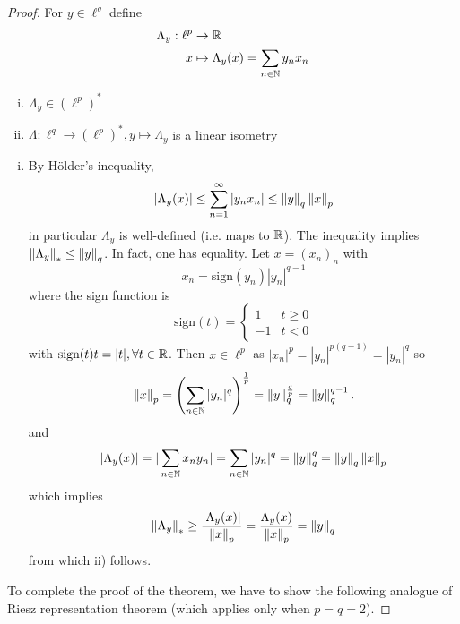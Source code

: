 \documentclass{article}
\begin{document}
\begin{proof}
	For  \(y \in \ell^q\) define
	\begin{align*}
		\Lambda_y: \ell^p & \to \mathbb{R}                                         \\
		x                 & \mapsto \Lambda_y(x) = \sum_{n \in \mathbb{N}} y_n x_n
	\end{align*}

	\begin{lemma}
		\phantom{a lemma here}
		\label{isometry in lp dual}
		\begin{enumerate}[i)]
			\item  \(\Lambda_y \in (\ell^p)^*\)
			\item  \(\Lambda: \ell^q \to (\ell^p)^*, y \mapsto \Lambda_y\) is a linear isometry
		\end{enumerate}
	\end{lemma}
	\begin{enumerate}[i)]
		\item By Hölder's inequality,
		      \begin{equation*}
			      \left|\Lambda_y(x)\right|
			      \leq\sum_{n=1}^{\infty}|y_n x_n|
			      \leq\left\|{y}\right\|_q\left\|{x}\right\|_p
		      \end{equation*}
		      in particular  \(\Lambda_y\) is well-defined (i.e. maps to  \(\mathbb{R}\)). The inequality implies  \(\left\|{\Lambda_y}\right\|_* \leq \left\|{y}\right\|_q\).
		      In fact, one has equality. Let  \(x=(x_n)_n\) with
		      \[x_n = \textrm{sign}(y_n) |y_n|^{q-1}\]
		      where the sign function is
		      \begin{equation*}
			      \textrm{sign}(t) = \begin{cases}
				      1  & t \geq 0 \\
				      -1 & t<0
			      \end{cases}
		      \end{equation*}
		      with  \(\textrm{sign}(t)t=|t|, \forall t \in \mathbb{R}\).
		      Then  \(x \in \ell^p\) as  \(|x_n|^p=|y_n|^{p(q-1)}=|y_n|^q\) so
		      \[
			      \left\|{x}\right\|_p = \left(\sum_{n \in \mathbb{N}} |y_n|^q\right)^{\frac{1}{p}} = \left\|{y}\right\|_q^{\frac{q}{p}} = \left\|{y}\right\|_q^{q-1}.
		      \]
		      and
		      \[
			      |\Lambda_y(x)| = |\sum_{n \in \mathbb{N}} x_ny_n| = \sum_{n \in \mathbb{N}} |y_n|^q = \left\|{y}\right\|^q_q =\left\|{y}\right\|_q\left\|{x}\right\|_p
		      \]
		      which implies
		      \[
			      \left\|{\Lambda_y}\right\|_* \geq \frac{|\Lambda_y(x)|}{\left\|{x}\right\|_p} = \frac{\Lambda_y(x)}{\left\|{x}\right\|_p} = \left\|{y}\right\|_q
		      \]
		      from which ii) follows.
	\end{enumerate}
	To complete the proof of the theorem, we have to show the following analogue of Riesz representation theorem (which applies only when  \(p=q=2\)).


\end{proof}
\end{document}

